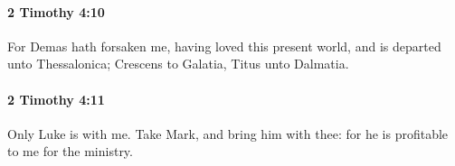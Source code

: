 		\paragraph{2 Timothy 4:10} %
			\label{2TIMOTHY-4-10}

			For Demas hath forsaken me, having loved this present world, and is departed unto Thessalonica; Crescens to Galatia, Titus unto Dalmatia.

			\begin{framed}
			\scriptsize
				\begin{compactdesc}
					\item[SBLG] 
				\end{compactdesc}
			\end{framed}

		\paragraph{2 Timothy 4:11} %
			\label{2TIMOTHY-4-11}

			Only Luke is with me.  Take Mark, and bring him with thee: for he is profitable to me for the ministry.

